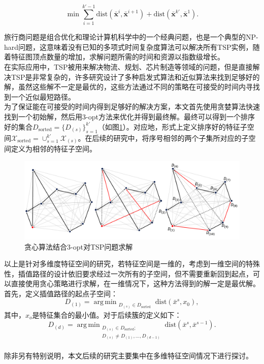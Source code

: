 \documentclass{NauThesis}
\DeclareMathOperator*{\argmin}{arg\,min}
\begin{document}
\begin{equation} \label{equ2}
    \min{\sum\limits_{i=1}^{k'-1}\text{dist}(\boldsymbol{\bar{x}}^i,\boldsymbol{\bar{x}}^{i+1})}+\text{dist}(\boldsymbol{\bar{x}}^{k'},\boldsymbol{\bar{x}}^1). 
\end{equation}

旅行商问题是组合优化和理论计算机科学中的一个经典问题，也是一个典型的NP-hard问题，这意味着没有已知的多项式时间复杂度算法可以解决所有TSP实例，随着特征图顶点数量的增加，求解问题所需的时间和资源以指数级增长。
\\\hspace*{2em}在实际应用中，TSP被用来解决物流、规划、芯片制造等领域的问题\cite{ref53,ref54,ref55,ref56,ref57,ref58,ref59}，但是直接解决TSP是非常复杂的，许多研究设计了多种启发式算法和近似算法来找到足够好的解\cite{ref60,ref61,ref62,ref63,ref64,ref65}，虽然这些解不一定是最优的，这些方法通过不同的策略在可接受的时间内寻找到一个近似最短路径。
\\\hspace*{2em}为了保证能在可接受的时间内得到足够好的解决方案，本文首先使用贪婪算法快速找到一个初始解，然后用3-opt方法来优化并得到最终解。最终可以得到一个排序好的集合$D_\text{sorted}=\{D_{(s)}\}_{s=1}^{k'}$（如图\ref{fig4}）。对应地，形式上定义排序好的特征子空间$\mathcal{X}_{\text{sorted}} = \cup_{s=1}^{k'} \mathcal{X}_{(s)}$。在后续的研究中，将序号相邻的两个子集所对应的子空间定义为相邻的特征子空间。
\begin{figure}[htbp]
    \centering
    \includegraphics[width=1.0\textwidth]{figs/fig4.png}
    \caption{贪心算法结合3-opt对TSP问题求解}
    \label{fig4}
\end{figure}
\newpage
以上是针对多维度特征空间的研究，若特征空间是一维的，考虑到一维空间的特殊性，插值路径的设计依旧要求经过一次所有的子空间，但不需要重新回到起点，可以直接使用贪心策略进行求解，在一维情况下，这种方法得到的解一定是最优解。首先，定义插值路径的起点子空间：
\begin{equation} \label{equ3}
    D_{(1)}=\argmin_{\substack{D_{(s)}\in D_{\text{sorted}}}}\text{dist}({\bar{x}}^s,{x}_0),    
\end{equation}
其中，$x_o$是特征集合的最小值。对于后续簇的定义如下：
\begin{equation} \label{equ4}
    D_{(d)} = \argmin_{\substack{D_{(s)} \in D_{\text{sorted}}; \\ D_{(s)} \neq D_{(1)}, \ldots, D_{(d-1)}}}\text{dist}\left(\bar{x}^s, \bar{x}^{s-1}\right).   
\end{equation}
\\\hspace*{2em}除非另有特别说明，本文后续的研究主要集中在多维特征空间情况下进行探讨。
\end{document}
